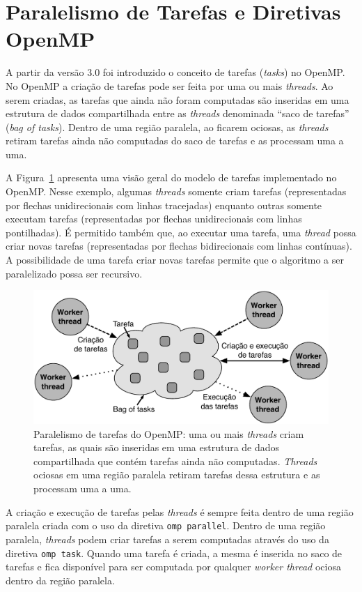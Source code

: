\documentclass{SBCbookchapter}
\begin{document}
\section{Paralelismo de Tarefas e Diretivas OpenMP}

	A partir da versão 3.0 foi introduzido o conceito de tarefas (\textit{tasks}) no OpenMP.
	No OpenMP a criação de tarefas pode ser feita por uma ou mais \textit{threads}. Ao
	serem criadas, as tarefas que ainda não foram computadas são inseridas em uma
	estrutura de dados compartilhada entre as \textit{threads} denominada ``saco de tarefas''
	(\textit{bag of tasks}). Dentro de uma região paralela, ao ficarem ociosas, as \textit{threads}
	retiram tarefas ainda não computadas do saco de tarefas e as processam uma a uma.
	
	A Figura~\ref{fig:tasks} apresenta uma visão geral do modelo de tarefas implementado
	no OpenMP. Nesse exemplo, algumas \textit{threads} somente criam tarefas (representadas
	por flechas unidirecionais com linhas tracejadas) enquanto outras somente executam tarefas
	(representadas por flechas unidirecionais com linhas pontilhadas). É permitido também que,
	ao executar uma tarefa, uma \textit{thread} possa criar novas tarefas (representadas por
	flechas bidirecionais com linhas contínuas). A possibilidade de uma tarefa criar novas tarefas
	permite que o algoritmo a ser paralelizado possa ser recursivo.
	
		\begin{figure}[t]
			\centering
			\includegraphics[width=0.6\linewidth]{img/tasks}
			\caption{Paralelismo de tarefas do OpenMP: uma ou mais \textit{threads} criam
			tarefas, as quais são inseridas em uma estrutura de dados compartilhada
			que contém tarefas ainda não computadas. \textit{Threads} ociosas em
			uma região paralela retiram tarefas dessa estrutura e as processam uma a
			uma.}
			\label{fig:tasks}
		\end{figure}

	A criação e execução de tarefas pelas \textit{threads} é sempre feita dentro de uma região paralela
	criada com o uso da diretiva \texttt{omp parallel}. Dentro de uma região paralela, \textit{threads} podem
	criar tarefas a serem computadas através do uso da diretiva \texttt{omp task}. Quando uma tarefa é criada,
	a mesma é inserida no saco de tarefas e fica disponível para ser computada por qualquer \textit{worker thread}
	ociosa dentro da região paralela.
\end{document}
